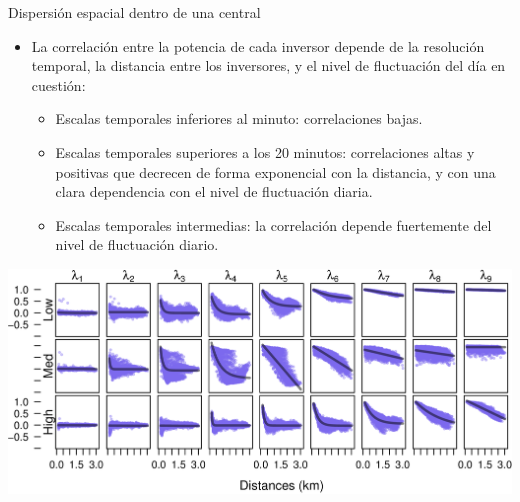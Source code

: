 \documentclass[aspectratio=169, usenames,svgnames,dvipsnames]{beamer}
\begin{document}
\begin{frame}[label={sec:orgdb9f711}]{Dispersión espacial dentro de una central}
\begin{itemize}
\item La correlación entre la potencia de cada inversor depende de la resolución temporal, la distancia entre los inversores, y el nivel de fluctuación del día en cuestión:
\begin{itemize}
\item Escalas temporales inferiores al minuto: correlaciones bajas.
\item Escalas temporales superiores a los 20 minutos: correlaciones altas y positivas que decrecen de forma exponencial con la distancia, y con una clara dependencia con el nivel de fluctuación diaria.
\item Escalas temporales intermedias: la correlación depende fuertemente del nivel de fluctuación diario.
\end{itemize}
\end{itemize}

\begin{center}
\includegraphics[height=0.6\textheight]{../figs/corDistMatrix_nls.png}
\end{center}
\end{frame}
\end{document}
